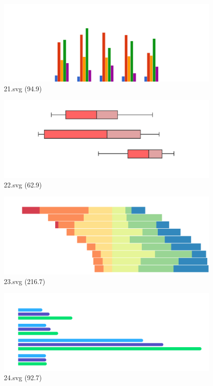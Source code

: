 \documentclass[journal]{IEEEtran}
\begin{document}
\begin{figure}[!htbp]
\centering
\begin{minipage}{0.233\columnwidth}
\centering
\includegraphics[width=\textwidth]{Train_set/21.pdf}
{21.svg (94.9)}
\end{minipage}
\hfill
\begin{minipage}{0.233\columnwidth}
\centering
\includegraphics[width=\textwidth]{Train_set/22.pdf}
{22.svg (62.9)}
\end{minipage}
\hfill
\begin{minipage}{0.233\columnwidth}
\centering
\includegraphics[width=\textwidth]{Train_set/23.pdf}
{23.svg (216.7)}
\end{minipage}
\hfill
\begin{minipage}{0.233\columnwidth}
\centering
\includegraphics[width=\textwidth]{Train_set/24.pdf}
{24.svg (92.7)}
\end{minipage}
\end{figure}
\end{document}
